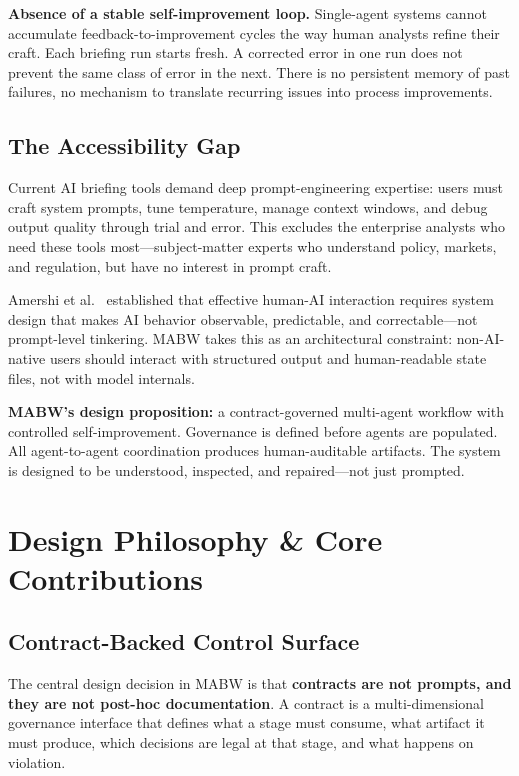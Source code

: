 \documentclass[11pt,a4paper]{article}
\begin{document}
\textbf{Absence of a stable self-improvement loop.} Single-agent systems cannot accumulate feedback-to-improvement cycles the way human analysts refine their craft. Each briefing run starts fresh. A corrected error in one run does not prevent the same class of error in the next. There is no persistent memory of past failures, no mechanism to translate recurring issues into process improvements.

\subsection{The Accessibility Gap}

Current AI briefing tools demand deep prompt-engineering expertise: users must craft system prompts, tune temperature, manage context windows, and debug output quality through trial and error. This excludes the enterprise analysts who need these tools most---subject-matter experts who understand policy, markets, and regulation, but have no interest in prompt craft.

Amershi et al.~\cite{amershi2019} established that effective human-AI interaction requires system design that makes AI behavior observable, predictable, and correctable---not prompt-level tinkering. MABW takes this as an architectural constraint: non-AI-native users should interact with structured output and human-readable state files, not with model internals.

\textbf{MABW's design proposition:} a contract-governed multi-agent workflow with controlled self-improvement. Governance is defined before agents are populated. All agent-to-agent coordination produces human-auditable artifacts. The system is designed to be understood, inspected, and repaired---not just prompted.

\section{Design Philosophy \& Core Contributions}
\label{sec:design}

\subsection{Contract-Backed Control Surface}

The central design decision in MABW is that \textbf{contracts are not prompts, and they are not post-hoc documentation}. A contract is a multi-dimensional governance interface that defines what a stage must consume, what artifact it must produce, which decisions are legal at that stage, and what happens on violation.
\end{document}
